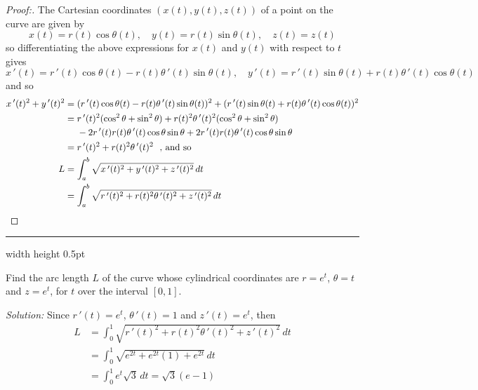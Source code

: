 \begin{proofbar}\vspace{-3mm}\begin{proof}[Proof:]
 The Cartesian coordinates $(x(t),y(t),z(t))$ of a point on the curve are given by
 \begin{displaymath}
  x(t) = r(t) \cos \theta(t), \quad y(t) = r(t) \sin \theta(t), \quad z(t) = z(t)
 \end{displaymath}
 so differentiating the above expressions for $x(t)$ and $y(t)$ with respect to $t$ gives
 \begin{displaymath}
  x\,'(t) = r\,'(t) \cos \theta(t) - r(t) \theta\, '(t) \sin \theta(t), \quad
  y\,'(t) = r\,'(t) \sin \theta(t) + r(t) \theta\, '(t) \cos \theta(t)
 \end{displaymath}
 and so
 \begin{align*}
  x\,'(t)^2 + y\,'(t)^2 &= (r\,'(t) \cos \theta(t) - r(t) \theta\, '(t) \sin \theta(t))^2 +
   (r\,'(t) \sin \theta(t) + r(t) \theta\, '(t) \cos \theta(t))^2\\
   &= r\,'(t)^2 (\cos^2 \theta + \sin^2 \theta) + r(t)^2 \theta\,'(t)^2 (\cos^2 \theta + \sin^2 \theta)\\
   &\mathrel{\phantom{=}} {} -
    2r\,'(t) r(t) \theta\, '(t) \cos \theta \sin \theta + 2r\,'(t) r(t) \theta\, '(t) \cos \theta \sin \theta\\
   &= r\,'(t)^2 + r(t)^2 \theta\,'(t)^2 \text{~~, and so}\\
  L &= \int_{a}^{b} \sqrt{x\,'(t)^2 + y\,'(t)^2 + z\,'(t)^2} \, dt\\
  &= \int_{a}^{b} \sqrt{r\,'(t)^2 + r(t)^2 \theta\,'(t)^2 + z\,'(t)^2} \, dt \hfill \qedhere
 \end{align*}
\end{proof}\vspace{-3mm}\end{proofbar}

\vspace{2mm}
\hrule width \textwidth height 0.5pt
\begin{exmp}\label{exmp:arclencyl}
 Find the arc length $L$ of the curve whose cylindrical coordinates are $r = e^t$, $\theta = t$ and $z = e^t$, for $t$
 over the interval $[0,1]$.\vspace{1mm}
 \par\noindent \emph{Solution:} Since $r\,'(t) = e^t$, $\theta\,'(t) = 1$ and $z\,'(t) = e^t$, then
 \begin{align*}
  L &= \int_{0}^{1} \sqrt{r\,'(t)^2 + r(t)^2 \theta\,'(t)^2 + z\,'(t)^2} \, dt\\
  &= \int_{0}^{1} \sqrt{e^{2t} + e^{2t}(1) + e^{2t}} \, dt\\
  &= \int_{0}^{1} e^t \sqrt{3} \, dt = \sqrt{3} (e - 1)
 \end{align*}
\end{exmp}

